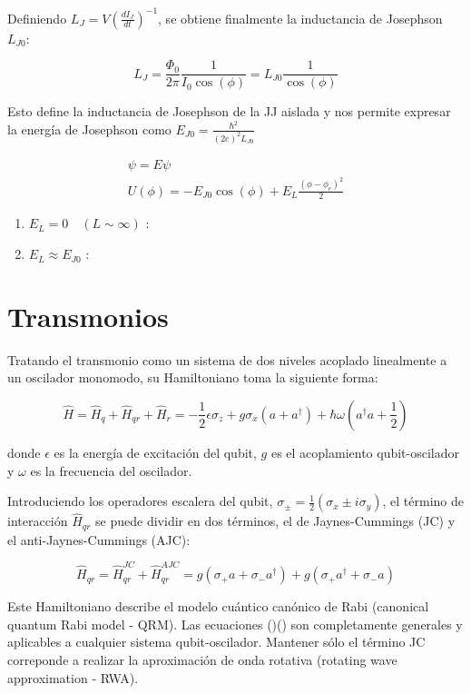 \documentclass[11pt, spanish]{report}
\begin{document}
Definiendo $L_J = V (\frac{dI_J}{dt})^{-1}$, se obtiene finalmente la inductancia de Josephson $L_{J0}$:

\[
L_J = \frac{\Phi_0}{2\pi} \frac{1}{I_0 \cos(\phi)} = L_{J0} \frac{1}{\cos(\phi)}
\]

Esto define la inductancia de Josephson de la JJ aislada y nos permite expresar la energía de Josephson como $E_{J0} = \frac{\hbar^2}{(2e)^2L_{J0}}$

\begin{align*}
[E_C (-i\hbar \frac{\partial}{\partial\phi}-n_g)^2 + U(\phi)] \psi = E \psi \\
U(\phi) = -E_{J0} \cos(\phi) + E_L \frac{(\phi-\phi_e)^2}{2}
\end{align*}

\begin{enumerate}
\item $E_L = 0 \quad (L \sim \infty)$ :
\item $E_L \approx E_{J0}$ :
\end{enumerate}

\section{Transmonios}
Tratando el transmonio como un sistema de dos niveles acoplado linealmente a un oscilador monomodo, su Hamiltoniano toma la siguiente forma:

\[
\hat{H} = \hat{H}_q + \hat{H}_{qr} + \hat{H}_r = -\frac{1}{2} \epsilon \sigma_z + g \sigma_x (a+a^\dag) + \hbar \omega (a^\dag a + \frac{1}{2})
\]

donde $\epsilon$ es la energía de excitación del qubit, $g$ es el acoplamiento qubit-oscilador y $\omega$ es la frecuencia del oscilador.
\vspace{0.5cm}

Introduciendo los operadores escalera del qubit, $\sigma_\pm = \frac{1}{2}(\sigma_x \pm i \sigma_y)$, el término de interacción $\hat{H}_{qr}$ se puede dividir en dos términos, el de Jaynes-Cummings (JC) y el anti-Jaynes-Cummings (AJC):

\[
\hat{H}_{qr} = \hat{H}_{qr}^{JC} + \hat{H}_{qr}^{AJC} = g(\sigma_+ a + \sigma_- a^\dag) + g(\sigma_+ a^\dag + \sigma_- a)
\]

Este Hamiltoniano describe el modelo cuántico canónico de Rabi (canonical quantum Rabi model - QRM). Las ecuaciones ()() son completamente generales y aplicables a cualquier sistema qubit-oscilador. Mantener sólo el término JC correponde a realizar la aproximación de onda rotativa (rotating wave approximation - RWA).
\end{document}

